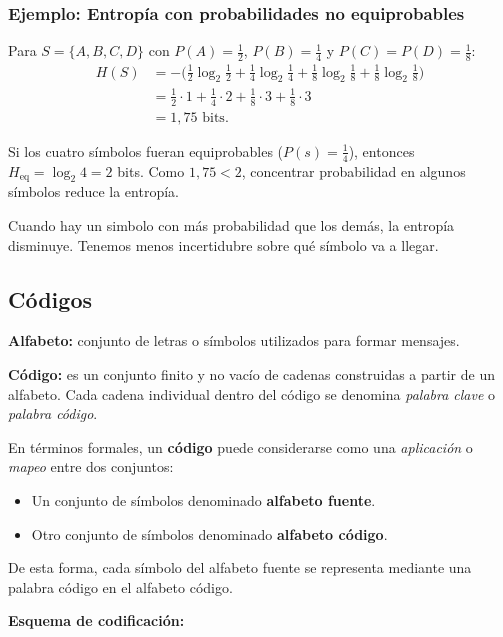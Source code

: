 \documentclass[11pt,a4paper]{article}
\begin{document}
\subsubsection*{Ejemplo: Entropía con probabilidades no equiprobables}
Para $S=\{A,B,C,D\}$ con $P(A)=\tfrac12$, $P(B)=\tfrac14$ y $P(C)=P(D)=\tfrac18$:
\[
\begin{aligned}
H(S) &= -\Big(\tfrac12\log_2\tfrac12 + \tfrac14\log_2\tfrac14 + \tfrac18\log_2\tfrac18 + \tfrac18\log_2\tfrac18\Big) \\
	&= \tfrac12\cdot 1 + \tfrac14\cdot 2 + \tfrac18\cdot 3 + \tfrac18\cdot 3 \\
	&= 1{,}75 \text{ bits.}
\end{aligned}
\]

\begin{NotaBox}
Si los cuatro símbolos fueran equiprobables ($P(s)=\tfrac14$), entonces
$H_{\text{eq}}=\log_2 4 = 2$ bits. Como $1{,}75<2$, concentrar probabilidad en
algunos símbolos reduce la entropía.
\end{NotaBox}

Cuando hay un simbolo con más probabilidad que los demás, la entropía disminuye. Tenemos menos incertidubre sobre qué símbolo va a llegar.
\subsection{Códigos}

\textbf{Alfabeto:} conjunto de letras o símbolos utilizados para formar mensajes.

\medskip

\textbf{Código:} es un conjunto finito y no vacío de cadenas construidas a partir de un alfabeto.
Cada cadena individual dentro del código se denomina \emph{palabra clave} o \emph{palabra código}.

\medskip

En términos formales, un \textbf{código} puede considerarse como una \emph{aplicación} o \emph{mapeo} entre dos conjuntos:
\begin{itemize}
    \item Un conjunto de símbolos denominado \textbf{alfabeto fuente}.
    \item Otro conjunto de símbolos denominado \textbf{alfabeto código}.
\end{itemize}

De esta forma, cada símbolo del alfabeto fuente se representa mediante una palabra código en el alfabeto código.

\textbf{Esquema de codificación:}
\end{document}
